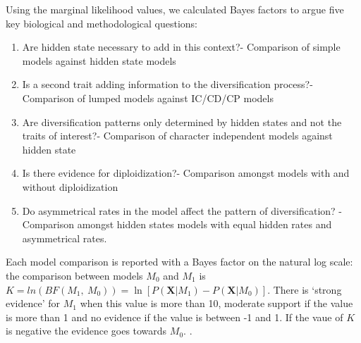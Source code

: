Using the marginal likelihood values, we calculated Bayes factors to argue five key biological and methodological questions:
\begin{enumerate}
\item Are hidden state necessary to add in this context?- Comparison of simple models against hidden state models
\item Is a second trait adding information to the diversification process?- Comparison of lumped models against IC/CD/CP models
\item Are diversification patterns only determined by hidden states and not the traits of interest?- Comparison of character independent models against hidden state 
\item Is there evidence for diploidization?- Comparison amongst models with and without diploidization
\item Do asymmetrical rates in the model affect the pattern of diversification? - Comparison amongst hidden states models with equal hidden rates and asymmetrical rates.
\end{enumerate}

Each model comparison is reported with a Bayes factor on the natural log scale: the comparison between models $M_0$ and $M_1$ is $K=ln(BF(M_1,\ M_0)) = \ln[ P(\mathbf{X} | M_1) - P(\mathbf{X} | M_0)]$.
There is `strong evidence'  for $M_1$ when this value is more than 10, moderate support if the value is more than 1 and no evidence if the value is between -1 and 1. If the vaue of  $K$ is negative the evidence goes towards $M_0$.  \citep{kass1995}.


